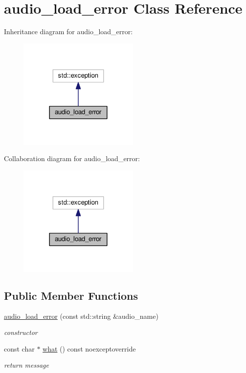 \hypertarget{classaudio__load__error}{}\section{audio\+\_\+load\+\_\+error Class Reference}
\label{classaudio__load__error}


Inheritance diagram for audio\+\_\+load\+\_\+error\+:\nopagebreak
\begin{figure}[H]
\begin{center}
\leavevmode
\includegraphics[width=168pt]{classaudio__load__error__inherit__graph}
\end{center}
\end{figure}


Collaboration diagram for audio\+\_\+load\+\_\+error\+:\nopagebreak
\begin{figure}[H]
\begin{center}
\leavevmode
\includegraphics[width=168pt]{classaudio__load__error__coll__graph}
\end{center}
\end{figure}
\subsection*{Public Member Functions}
\begin{DoxyCompactItemize}
\item 
\hyperlink{classaudio__load__error_a6eea512cfea7b3d438afc5c1af8c63aa}{audio\+\_\+load\+\_\+error} (const std\+::string \&audio\+\_\+name)
\begin{DoxyCompactList}\small\item\em constructor \end{DoxyCompactList}\item 
const char $\ast$ \hyperlink{classaudio__load__error_aa0559f9224f08e4a762f4284a2d76a47}{what} () const noexceptoverride
\begin{DoxyCompactList}\small\item\em return message \end{DoxyCompactList}\end{DoxyCompactItemize}


